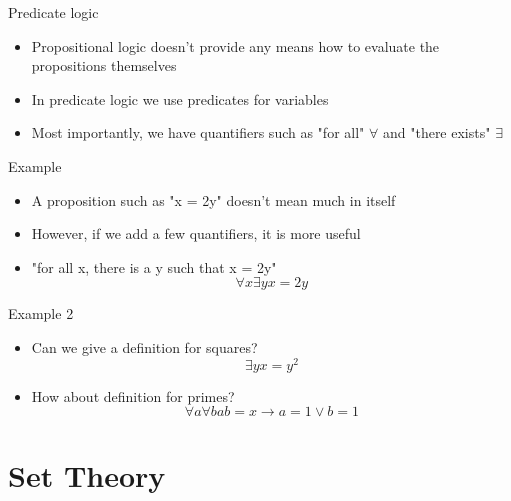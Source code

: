 \documentclass[utf8]{beamer}
\let\implies\rightarrow
\begin{document}
\begin{frame}{Predicate logic}
\begin{itemize}
\item Propositional logic doesn't provide any means how to evaluate the propositions themselves
\item In predicate logic we use predicates for variables
\item Most importantly, we have quantifiers such as "for all" $\forall$ and "there exists" $\exists$
\end{itemize}
\end{frame}

\begin{frame}{Example}
\begin{itemize}
\item A proposition such as "x = 2y" doesn't mean much in itself
\item However, if we add a few quantifiers, it is more useful
\item "for all x, there is a y such that x = 2y"
\[ \forall x \exists y x = 2y \]
\end{itemize}
\end{frame}

\begin{frame}{Example 2}
\begin{itemize}
\item Can we give a definition for squares?
\[ \exists y x = y^2 \]
\item How about definition for primes?
\[ \forall a \forall b ab = x \implies a = 1 \lor b = 1 \]
\end{itemize}
\end{frame}

\part{Set Theory}
\begin{frame}
\partpage
\end{frame}
\end{document}
